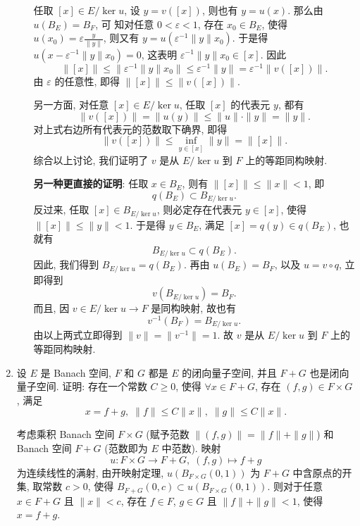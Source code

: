 \begin{enumerate}
\begin{answer}
\begin{enumerate}
        任取 $[x]\in E/\ker u$, 设 $y=v([x])$, 则也有 $y=u(x)$. 那么由 $u(B_{E})=B_{F}$, 可
        知对任意 $0<\varepsilon<1$, 存在 $x_{0}\in B_{E}$, 使得 
        $u(x_0)=\varepsilon \frac{y}{\|y\|}$, 则又有 $y=u(\varepsilon^{-1}\|y\| x_{0})$.
        于是得 $u(x-\varepsilon^{-1}\|y\| x_{0})=0$, 这表明 $\varepsilon^{-1}\|y\| x_{0}\in [x]$. 因此
        \[
        \|[x]\| \leq\bigl\|\varepsilon^{-1}\|y\|x_{0}\bigr\|\leq\varepsilon^{-1}\|y\|=\varepsilon^{-1}\|v([x])\| .
        \]
        由 $\varepsilon$ 的任意性, 即得 $\|[x]\|\leq\|v([x])\|$.
    
        另一方面, 对任意 $[x]\in E/\ker u$, 任取 $[x]$ 的代表元 $y$, 都有
        \[
        \|v([x])\|=\|u(y)\| \leq\|u\|\cdot\|y\|=\|y\|.
        \]
        对上式右边所有代表元的范数取下确界, 即得
        \[\|v([x])\|\leq\inf_{y\in [x]}\|y\|=\|[x]\|.\]
        综合以上讨论, 我们证明了 $v$ 是从 $E/\ker u$ 到 $F$ 上的等距同构映射.
    
        \textbf{另一种更直接的证明}:
        任取 $x\in B_E$, 则有 $\|[x]\|\leq\|x\|<1$, 即
        \[q(B_E)\subset B_{E/\ker u}.\]
        反过来, 任取 $[x]\in B_{E/\ker u}$, 则必定存在代表元 $y\in[x]$, 
        使得 $\|[x]\|\leq\|y\|<1$. 于是得 $y\in B_{E}$, 满足 $[x]=q(y)\in q(B_{E})$, 也就有
        \[
        B_{E/\ker u}\subset q(B_{E}).
        \]
        因此, 我们得到 $B_{E/\ker u}=q(B_{E})$. 再由 $u(B_{E})=B_{F}$, 以及 $u=v \circ q$, 立即得到
        \[
        v(B_{E/\ker u})=B_{F}.
        \]
        而且, 因 $v\in E/\ker u\to F$ 是同构映射, 故也有
        \[
        v^{-1}(B_{F})=B_{E/\ker u}.
        \]
        由以上两式立即得到 $\|v\|=\|v^{-1}\|=1$. 故 $v$ 是从 $E/\ker u$ 到 $F$ 上的等距同构映射.
      \end{enumerate}
    \end{answer}
  \item 设 $E$ 是 Banach 空间, $F$ 和 $G$ 都是 $E$ 的闭向量子空间, 并且 $F+G$
  也是闭向量子空间. 证明: 存在一个常数 $C\geq 0$, 使得 $\forall x\in F+G$,
  存在 $(f,g)\in F\times G$, 满足
  \[x=f+g,\;\|f\|\leq C\|x\|,\;\|g\|\leq C\|x\|.\]
    \begin{answer}
      考虑乘积 Banach 空间 $F\times G$ (赋予范数 $\|(f,g)\|=\|f\|+\|g\|$)
      和 Banach 空间 $F+G$ (范数即为 $E$ 中范数). 映射
      \[u:F\times G\to F+G,\;(f,g)\mapsto f+g\]
      为连续线性的满射, 由开映射定理, $u(B_{F\times G}(0,1))$ 为 $F+G$ 中含原点的开集,
      取常数 $c>0$, 使得 $B_{F+G}(0,c)\subset u(B_{F\times G}(0,1))$.
      则对于任意 $x\in F+G$ 且 $\|x\|<c$, 存在 $f\in F$, $g\in G$
      且 $\|f\|+\|g\|<1$, 使得 $x=f+g$.


\end{answer}
\end{enumerate}
